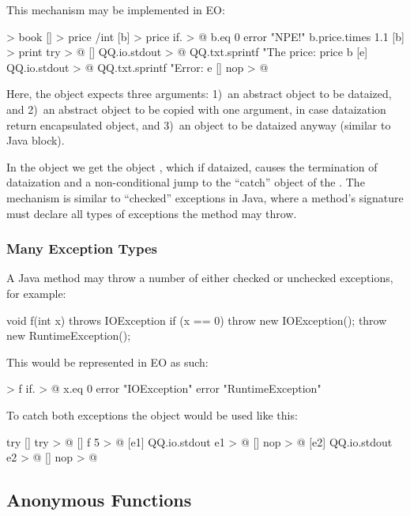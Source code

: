 \documentclass[sigplan,11pt,nonacm,natbib=false]{acmart}
\begin{document}
This mechanism may be implemented in EO:

\begin{ffcode}
[] > book
  [] > price /int
[b] > price
  if. > @
    b.eq 0
    error "NPE!"
    b.price.times 1.1
[b] > print
  try > @
    []
      QQ.io.stdout > @
        QQ.txt.sprintf
        "The price: %
        price b
    [e]
      QQ.io.stdout > @
        QQ.txt.sprintf
        "Error: %
        e
    []
      nop > @
\end{ffcode}

Here, the object  expects three arguments: 1)~an abstract object to be dataized, and 2)~an abstract object to be copied with one argument, in case dataization return encapsulated object, and 3)~an object to be dataized anyway (similar to Java  block).

In the object  we get the object , which if dataized, causes the termination of dataization and a non-conditional jump to the ``catch'' object of the . The mechanism is similar to ``checked'' exceptions in Java, where a method's signature must declare all types of exceptions the method may throw.

\subsubsection{Many Exception Types}

A Java method may throw a number of either checked or unchecked exceptions, for example:

\begin{ffcode}
void f(int x) throws IOException {
  if (x == 0) {
    throw new IOException();
  }
  throw new RuntimeException();
}
\end{ffcode}

This would be represented in EO as such:

\begin{ffcode}
[x] > f
  if. > @
    x.eq 0
    error "IOException"
    error "RuntimeException"
\end{ffcode}

To catch both exceptions the object  would be used like this:

\begin{ffcode}
try
  []
    try > @
      []
        f 5 > @
      [e1]
        QQ.io.stdout e1 > @
      []
        nop > @
  [e2]
    QQ.io.stdout e2 > @
  []
    nop > @
\end{ffcode}

\subsection{Anonymous Functions}
\label{sec:blocks}
\end{document}
